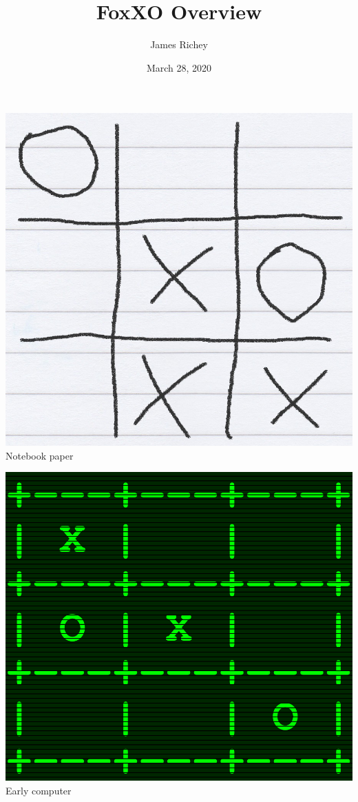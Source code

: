 \documentclass{tufte-handout}
\title{FoxXO Overview}
\author{James Richey}
\date{March 28, 2020}
\begin{document}
\maketitle


\begin{marginfigure}
  \includegraphics[width=\linewidth]{img/concept-art/paper}
  Notebook paper
\end{marginfigure}

\begin{marginfigure}
  \includegraphics[width=\linewidth]{img/concept-art/computer}
  Early computer
\end{marginfigure}
\end{document}
